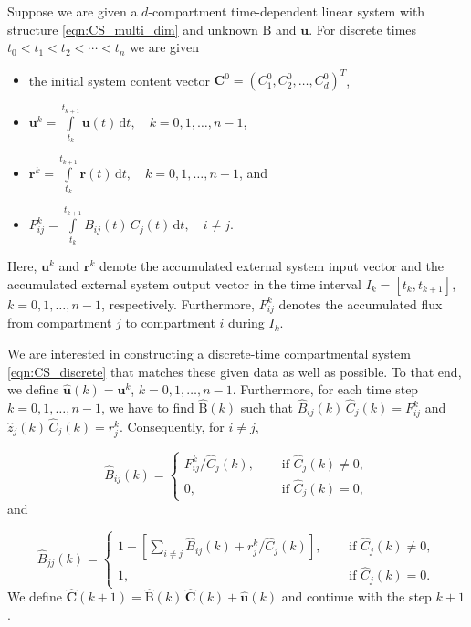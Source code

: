 \documentclass[draft]{agujournal2019}
\renewcommand{\vec}[1]{\mathbf{#1}}
\newcommand{\tens}[1]{\mathrm{#1}}
\newcommand{\dd}[1]{\,\mathrm{d}#1}
\newcommand{\intl}{\int\limits}
\newcommand{\suml}{\sum\limits}
\begin{document}
    Suppose we are given a $d$-compartment time-dependent linear system with structure \eqref{eqn:CS_multi_dim} and unknown $\tens{B}$ and $\vec{u}$.
    For discrete times $t_0<t_1<t_2<\cdots<t_n$ we are given
    \begin{itemize}
        \item the initial system content vector $\vec{C}^0=(C^0_1,C^0_2,\ldots,C^0_d)^T$,
        \item $\vec{u}^k = \intl_{t_k}^{t_{k+1}} \vec{u}(t)\dd{t},\quad k=0,1,\ldots,n-1$, 
        \item $\vec{r}^k = \intl_{t_k}^{t_{k+1}} \vec{r}(t)\dd{t},\quad k=0,1,\ldots,n-1$, and
        \item $F_{ij}^k = \intl_{t_k}^{t_{k+1}} B_{ij}(t)\,C_j(t)\dd{t},\quad i\neq j$.
    \end{itemize}
    Here, $\vec{u}^k$ and $\vec{r}^k$ denote the accumulated external system input vector and the accumulated external system output vector in the time interval $I_k=[t_k,t_{k+1}]$, $k=0,1,\ldots,n-1$, respectively.
    Furthermore, $F^k_{ij}$ denotes the accumulated flux from compartment $j$ to compartment $i$ during $I_k$.

    We are interested in constructing a discrete-time compartmental system \eqref{eqn:CS_discrete} that matches these given data as well as possible.
    To that end, we define $\widehat{\vec{u}}(k)=\vec{u}^k$, $k=0,1,\ldots,n-1$.
    Furthermore, for each time step $k=0,1,\ldots,n-1$, we have to find $\widehat{\tens{B}}(k)$ such that $\widehat{B}_{ij}(k)\,\widehat{C}_j(k)=F^k_{ij}$ and $\widehat{z}_j(k)\,\widehat{C}_j(k)=r^k_j$.
    Consequently, for $i\neq j$,
    
    \begin{equation*}
        \widehat{B}_{ij}(k) =
        \begin{cases}
            F^k_{ij} / \widehat{C}_j(k),\quad&\text{ if }\widehat{C}_j(k)\neq0,\\
            0, &\text{ if }\widehat{C}_j(k)=0,
        \end{cases}
    \end{equation*}
    and
    
    \begin{equation*}
        \widehat{B}_{jj}(k) = 
        \begin{cases}
            1-\left[\suml_{i\neq j}\widehat{B}_{ij}(k)+r^k_j/\widehat{C}_j(k)\right],\quad &\text{ if }\widehat{C}_j(k)\neq0,\\
            1, &\text{ if }\widehat{C}_j(k)=0.
        \end{cases}
    \end{equation*}
    We define $\widehat{\vec{C}}(k+1)=\widehat{\tens{B}}(k)\,\widehat{\vec{C}}(k)+\widehat{\vec{u}}(k)$ and continue with the step $k+1$.
    
\end{document}
